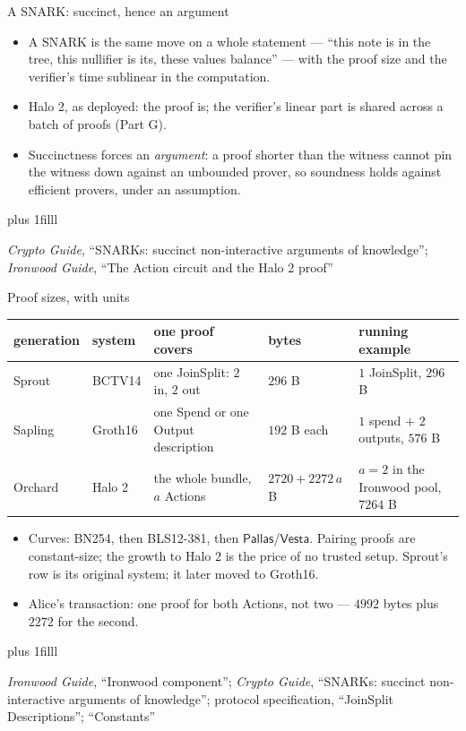 \documentclass[aspectratio=169,11pt]{beamer}
\newcommand{\Pallas}{\ensuremath{\mathsf{Pallas}}}
\newcommand{\Vesta}{\ensuremath{\mathsf{Vesta}}}
\newcommand{\src}[1]{\par\vskip0pt plus 1filll
  {\fontsize{6}{7.2}\selectfont\color{arbdim}\raggedright #1\par}}
\begin{document}
\begin{frame}{A SNARK: succinct, hence an argument}
\begin{itemize}
  \item A SNARK is the same move on a whole statement --- ``this note is in
    the tree, this nullifier is its, these values balance'' --- with the
    proof size and the verifier's time sublinear in the computation.
  \item Halo 2, as deployed: the proof is; the verifier's linear part is
    shared across a batch of proofs (Part G).
  \item Succinctness forces an \emph{argument}: a proof shorter than the
    witness cannot pin the witness down against an unbounded prover, so
    soundness holds against efficient provers, under an assumption.
\end{itemize}
\src{\emph{Crypto Guide}, ``SNARKs: succinct non-interactive arguments of
  knowledge''; \emph{Ironwood Guide}, ``The Action circuit and the Halo 2
  proof''}
\end{frame}

\begin{frame}{Proof sizes, with units}
\begin{center}\small
\begin{tabular}{@{}llp{}lp{}@{}}
\toprule
generation & system & one proof covers & bytes & running example \\
\midrule
Sprout & BCTV14 & \raggedright one JoinSplit: $2$ in, $2$ out & $296$ B &
  \raggedright $1$ JoinSplit, $296$ B \tabularnewline
Sapling & Groth16 & \raggedright one Spend or one Output description &
  $192$ B each & \raggedright $1$ spend $+$ $2$ outputs, $576$ B
  \tabularnewline
Orchard & Halo 2 & \raggedright the whole bundle, $a$ Actions &
  $2720 + 2272\,a$ B & \raggedright $a = 2$ in the Ironwood pool, $7264$ B
  \tabularnewline
\bottomrule
\end{tabular}
\end{center}
\begin{itemize}
  \item Curves: BN254, then BLS12-381, then \Pallas{}/\Vesta{}. Pairing
    proofs are constant-size; the growth to Halo 2 is the price of no
    trusted setup. Sprout's row is its original system; it later moved to
    Groth16.
  \item Alice's transaction: one proof for both Actions, not two ---
    $4992$ bytes plus $2272$ for the second.
\end{itemize}
\src{\emph{Ironwood Guide}, ``Ironwood component''; \emph{Crypto Guide},
  ``SNARKs: succinct non-interactive arguments of knowledge''; protocol
  specification, ``JoinSplit Descriptions''; ``Constants''}
\end{frame}
\end{document}
